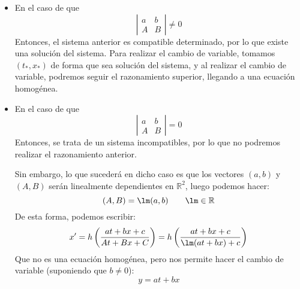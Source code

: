 \begin{itemize}
    \item En el caso de que
        \begin{equation*}
            \left|\begin{array}{cc}
                a & b \\
                A & B
            \end{array}\right| \neq 0
        \end{equation*}
        Entonces, el sistema anterior es compatible determinado, por lo que existe una solución del sistema. Para realizar el cambio de variable, tomamos $(t_*,x_*)$ de forma que sea solución del sistema, y al realizar el cambio de variable, podremos seguir el razonamiento superior, llegando a una ecuación homogénea.
    \item En el caso de que
        \begin{equation*}
            \left|\begin{array}{cc}
                a & b \\
                A & B
            \end{array}\right| = 0
        \end{equation*}
        Entonces, se trata de un sistema incompatibles, por lo que no podremos realizar el razonamiento anterior.

        Sin embargo, lo que sucederá en dicho caso es que los vectores $(a,b)$ y $(A,B)$ serán linealmente dependientes en $\mathbb{R}^2$, luego podemos hacer:
        \begin{equation*}
            (A,B) = \lm(a,b) \qquad \lm \in \mathbb{R}
        \end{equation*}
        De esta forma, podemos escribir:
        \begin{equation*}
            x' = h\left(\dfrac{at + bx + c}{At + Bx + C}\right) =  h\left(\dfrac{at + bx + c}{\lm(at+bx)+c}\right) 
        \end{equation*}
        Que no es una ecuación homogénea, pero nos permite hacer el cambio de variable (suponiendo que $b\neq 0$):
    \begin{equation*}
        y = at + bx 
    \end{equation*}
\end{itemize}

